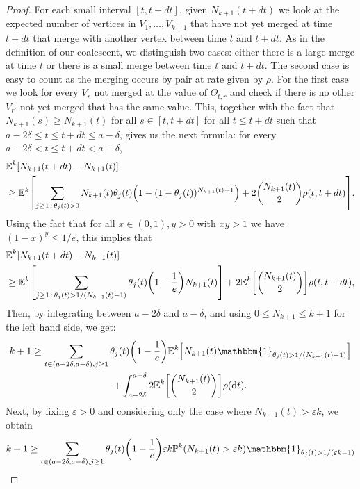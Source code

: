 \documentclass[AHL,Unicode,published]{cedram}
\newcommand{\probak}[1]{\mathbb{P}^k\left(#1\right)}
\newcommand{\e}{\varepsilon}
\newcommand{\rmd}{\mathrm{d}}
\newcommand{\E}{\mathbb{E}}
\newcommand{\1}{\mathbbm{1}}
\let\originalleft\left
\let\originalright\right
\renewcommand{\left}{\mathopen{}\mathclose\bgroup\originalleft}
\renewcommand{\right}{\aftergroup\egroup\originalright}
\begin{document}
\begin{proof}
For each small interval $[t,t+dt]$, given $N_{k+1}(t+dt)$ {we look} at the expected number of vertices in $V_1,\dots, V_{k+1}$ that have not yet merged at time $t+dt$ that merge with another vertex between time $t$ and $t+dt$. As in the definition of our coalescent, we distinguish two cases: either there is a large merge at time $t$ or there is a small merge between time $t$ and $t+dt$. The second case is easy to count as the merging occurs by pair at rate given by $\rho$. For the first case we look for every $V_r$ not merged at the value of $\Theta_{t,r}$ and check if there is no other $V_{r'}$ not yet merged that {has} the same value. This, together with the fact that $N_{k+1}(s)\ge N_{k+1}(t)$ for all $s\in [t,t+dt]$ {for all $t\le t+dt$ such that $a-2\delta \le t \le t+dt \le a-\delta$}, gives us the next formula: for every $a-2\delta<t\le t+dt<a-\delta$,
\begin{align*}
&\E^k [N_{k+1}(t+dt)-N_{k+1}(t)] \\
&\geq \E^k \left[\sum_{j\geq 1\,:\,\theta_j(t)>0} N_{k+1}(t)\theta_j(t)\left(1-(1-\theta_j(t))^{N_{k+1}(t)-1}\right) +2\binom{N_{k+1}(t)}{2}\rho(t,t+dt)\right].
\end{align*}
Using the fact that for all $x\in (0,1),y>0$ with $xy>1$ we have $(1-x)^y\leq 1/e$, this implies that
\begin{align*}
&\E^k[N_{k+1}(t+dt)-N_{k+1}(t)]\\
&\geq \E^k\left[\sum_{j\geq 1\,:\, \theta_j(t)>1/(N_{k+1}(t)-1)} \theta_j(t) \left(1-\frac{1}{e} \right){N_{k+1}(t)} \right]+2\E^k\left[\binom{N_{k+1}(t)}{2}\right]\rho(t,t+dt),
\end{align*}
Then, by integrating between $a-2\delta$ and $a-\delta$, and using $0\leq N_{k+1}\leq k+1$ for the left hand side, we get:
\begin{multline*}
k+1 \geq \sum_{\substack{ t\in (a-2\delta,a-\delta), j\geq 1}} \theta_j(t) \left(1- \frac{1}{e}\right)\E^k\left [{N_{k+1}(t)}\1_{\theta_j(t)>1/\left(N_{k+1}(t)-1\right)} \right]\\
+\int_{a-2\delta}^{a-\delta} 2\E^k \left [\binom{N_{k+1}(t)}{2}\right]\rho(\rmd t).
\end{multline*}
Next, by fixing $\e>0$ and considering only the case where $N_{k+1}(t)>\e k$, we obtain
\begin{multline*}
k+1 \geq \sum_{\substack{ t\in (a-2\delta,a-\delta), j\geq 1}} \theta_j(t) \left(1-\frac{1}{e}\right){\e k}\probak{N_{k+1}(t)>\e k}
\1_{\theta_j(t)>1/(\e k-1)}\\

\end{multline*}
\end{proof}
\end{document}
